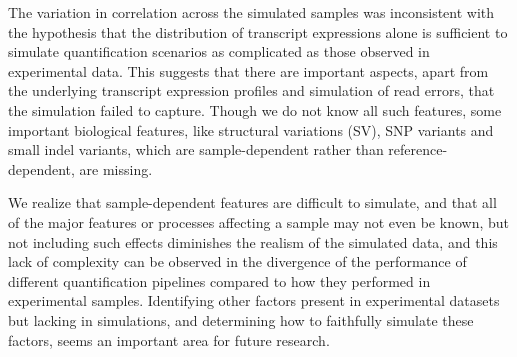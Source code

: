 The variation in correlation across the simulated samples was inconsistent 
with the hypothesis that the distribution of
transcript expressions alone is sufficient to simulate quantification scenarios
as complicated as those observed in experimental data. This suggests that there
are important aspects, apart from the underlying transcript expression profiles
and simulation of read errors, that the simulation failed to capture. Though
we do not know all such features, some important biological features, like
structural variations (SV), SNP variants and small indel variants, which are
sample-dependent rather than reference-dependent, are missing. 

We realize that sample-dependent features are difficult to simulate, and that all
of the major features or processes affecting a sample may not even be known, but
not including such effects diminishes the realism of the simulated data, and
this lack of complexity can be observed in the divergence of the performance of
different quantification pipelines compared to how they performed in experimental
samples. Identifying other factors present in experimental datasets but lacking
in simulations, and determining how to faithfully simulate these factors, seems
an important area for future research. 

